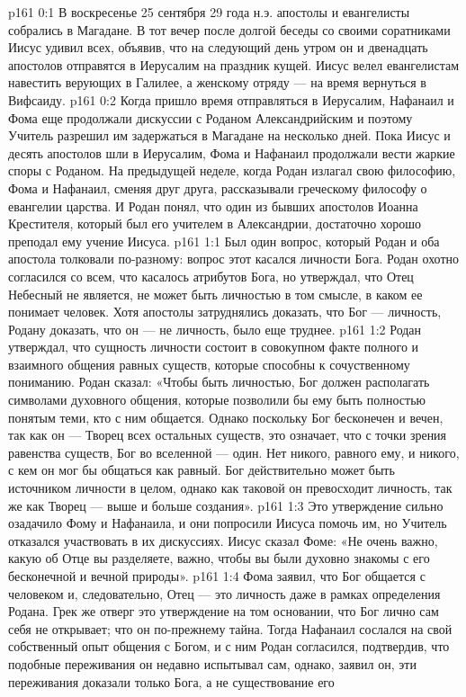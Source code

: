 \vs p161 0:1 В воскресенье 25 сентября 29 года н.э. апостолы и евангелисты собрались в Магадане. В тот вечер после долгой беседы со своими соратниками Иисус удивил всех, объявив, что на следующий день утром он и двенадцать апостолов отправятся в Иерусалим на праздник кущей. Иисус велел евангелистам навестить верующих в Галилее, а женскому отряду --- на время вернуться в Вифсаиду.
\vs p161 0:2 Когда пришло время отправляться в Иерусалим, Нафанаил и Фома еще продолжали дискуссии с Роданом Александрийским и поэтому Учитель разрешил им задержаться в Магадане на несколько дней. Пока Иисус и десять апостолов шли в Иерусалим, Фома и Нафанаил продолжали вести жаркие споры с Роданом. На предыдущей неделе, когда Родан излагал свою философию, Фома и Нафанаил, сменяя друг друга, рассказывали греческому философу о евангелии царства. И Родан понял, что один из бывших апостолов Иоанна Крестителя, который был его учителем в Александрии, достаточно хорошо преподал ему учение Иисуса.
\vs p161 1:1 Был один вопрос, который Родан и оба апостола толковали по\hyp{}разному: вопрос этот касался личности Бога. Родан охотно согласился со всем, что касалось атрибутов Бога, но утверждал, что Отец Небесный не является, не может быть личностью в том смысле, в каком ее понимает человек. Хотя апостолы затруднялись доказать, что Бог --- личность, Родану доказать, что он --- не личность, было еще труднее.
\vs p161 1:2 Родан утверждал, что сущность личности состоит в совокупном факте полного и взаимного общения равных существ, которые способны к сочуственному пониманию. Родан сказал: «Чтобы быть личностью, Бог должен располагать символами духовного общения, которые позволили бы ему быть полностью понятым теми, кто с ним общается. Однако поскольку Бог бесконечен и вечен, так как он --- Творец всех остальных существ, это означает, что с точки зрения равенства существ, Бог во вселенной --- один. Нет никого, равного ему, и никого, с кем он мог бы общаться как равный. Бог действительно может быть источником личности в целом, однако как таковой он превосходит личность, так же как Творец --- выше и больше создания».
\vs p161 1:3 Это утверждение сильно озадачило Фому и Нафанаила, и они попросили Иисуса помочь им, но Учитель отказался участвовать в их дискуссиях. Иисус сказал Фоме: «Не очень важно, какую  об Отце вы разделяете, важно, чтобы вы были духовно знакомы с  его бесконечной и вечной природы».
\vs p161 1:4 Фома заявил, что Бог общается с человеком и, следовательно, Отец --- это личность даже в рамках определения Родана. Грек же отверг это утверждение на том основании, что Бог лично сам себя не открывает; что он по\hyp{}прежнему тайна. Тогда Нафанаил сослался на свой собственный опыт общения с Богом, и с ним Родан согласился, подтвердив, что подобные переживания он недавно испытывал сам, однако, заявил он, эти переживания доказали только  Бога, а не существование его 
